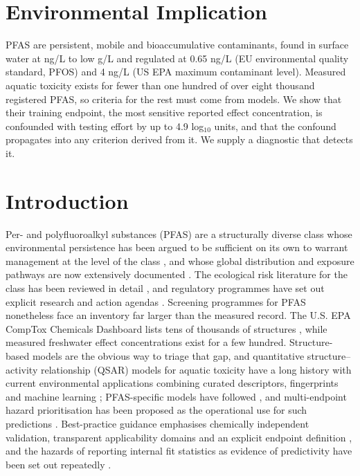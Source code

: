 \documentclass[preprint,12pt]{elsarticle}
\begin{document}
\section*{Environmental Implication}

PFAS are persistent, mobile and bioaccumulative contaminants, found in surface
water at ng/L to low \textmu g/L and regulated at 0.65 ng/L (EU environmental
quality standard, PFOS) and 4 ng/L (US EPA maximum contaminant level). Measured
aquatic toxicity exists for fewer than one hundred of over eight thousand
registered PFAS, so criteria for the rest must come from models. We show that
their training endpoint, the most sensitive reported effect concentration, is
confounded with testing effort by up to 4.9 log$_{10}$ units, and that the
confound propagates into any criterion derived from it. We supply a diagnostic
that detects it.

\section{Introduction}

Per- and polyfluoroalkyl substances (PFAS) are a structurally diverse class
whose environmental persistence has been argued to be sufficient on its own to
warrant management at the level of the class
\cite{kwiatkowski2020class,cousins2020persistence}, and whose global
distribution and exposure pathways are now extensively documented
\cite{wang2017never,sunderland2019exposure,cousins2022planetary}. The
ecological risk literature for the class has been reviewed in detail
\cite{ankley2021pfasrisk,mccarthy2017pfasecol}, and regulatory programmes have
set out explicit research and action agendas \cite{epa2021roadmap}. Screening
programmes for PFAS nonetheless face an inventory far larger than the measured
record. The U.S. EPA CompTox Chemicals
Dashboard lists tens of thousands of structures
\cite{williams2017comptox,epacomptox2026}, while measured freshwater effect
concentrations exist for a few hundred. Structure-based models are the obvious
way to triage that gap, and quantitative structure--activity relationship (QSAR)
models for aquatic toxicity have a long history
\cite{mazzatorta2005aquatic,nath2023aquatic} with current environmental
applications combining curated descriptors, fingerprints and machine learning
\cite{mansouri2018opera,ms2tox2022,jang2025opqsar}; PFAS-specific models have
followed \cite{sarkar2026pfasqsar}, and multi-endpoint hazard prioritisation
has been proposed as the operational use for such predictions
\cite{kim2026dualthreat}. Best-practice guidance emphasises chemically
independent validation, transparent applicability domains and an explicit
endpoint definition
\cite{tropsha2010best,cherkasov2014qsar,gramatica2007validation}, and the
hazards of reporting internal fit statistics as evidence of predictivity have
been set out repeatedly \cite{golbraikh2002q2}.
\end{document}
